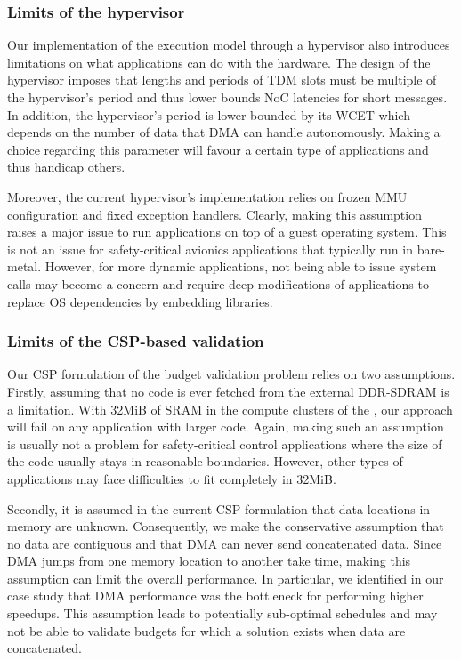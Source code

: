 \documentclass[main.tex]{subfiles}
\begin{document}
\subsubsection{Limits of the hypervisor} Our implementation of the execution
model through a hypervisor also introduces limitations on what applications can
do with the hardware. The design of the hypervisor imposes that lengths and
periods of TDM slots must be multiple of the hypervisor's period and thus lower
bounds NoC latencies for short messages. In addition, the hypervisor's period
is lower bounded by its WCET which depends on the number of data that DMA can
handle autonomously. Making a choice regarding this parameter will favour a
certain type of applications and thus handicap others.

Moreover, the current hypervisor's implementation relies on frozen MMU
configuration and fixed exception handlers. Clearly, making this assumption
raises a major issue to run applications on top of a guest operating system.
This is not an issue for safety-critical avionics applications that typically
run in bare-metal. However, for more dynamic applications, not being able to
issue system calls may become a concern and require deep modifications of
applications to replace OS dependencies by embedding libraries. 

\subsubsection{Limits of the CSP-based validation} Our CSP formulation of the
budget validation problem relies on two assumptions.  Firstly, assuming that no
code is ever fetched from the external DDR-SDRAM is a limitation. With 32MiB of
SRAM in the compute clusters of the \mppalong, our approach will fail on any
application with larger code. Again, making such an assumption is usually not a
problem for safety-critical control applications where the size of the code
usually stays in reasonable boundaries. However, other types of applications
may face difficulties to fit completely in 32MiB.

Secondly, it is assumed in the current CSP formulation that data locations in
memory are unknown. Consequently, we make the conservative assumption that no
data are contiguous and that DMA can never send concatenated data. Since DMA
jumps from one memory location to another take time, making this assumption can
limit the overall performance. In particular, we identified in our case study
that DMA performance was the bottleneck for performing higher speedups. This
assumption leads to potentially sub-optimal schedules and may not be able to
validate budgets for which a solution exists when data are concatenated.\\
\end{document}
